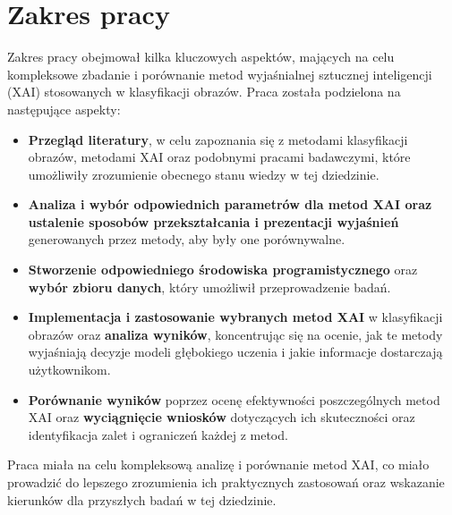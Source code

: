 \section*{Zakres pracy}
Zakres pracy obejmował kilka kluczowych aspektów, mających na celu kompleksowe zbadanie i porównanie metod wyjaśnialnej sztucznej inteligencji (XAI) stosowanych w klasyfikacji obrazów.
Praca została podzielona na następujące aspekty:
\begin{itemize}
	\item \textbf{Przegląd literatury}, w celu zapoznania się z metodami klasyfikacji obrazów, metodami XAI oraz podobnymi pracami badawczymi, które umożliwiły zrozumienie obecnego stanu wiedzy w tej dziedzinie.
	\item \textbf{Analiza i wybór odpowiednich parametrów dla metod XAI oraz ustalenie sposobów przekształcania i prezentacji wyjaśnień} generowanych przez metody, aby były one porównywalne.
	\item \textbf{Stworzenie odpowiedniego środowiska programistycznego} oraz \textbf{wybór zbioru danych}, który umożliwił przeprowadzenie badań.
	\item \textbf{Implementacja i zastosowanie wybranych metod XAI} w klasyfikacji obrazów oraz \textbf{analiza wyników}, koncentrując się na ocenie, jak te metody wyjaśniają decyzje modeli głębokiego uczenia i jakie informacje dostarczają użytkownikom.
	\item \textbf{Porównanie wyników} poprzez ocenę efektywności poszczególnych metod XAI oraz \textbf{wyciągnięcie wniosków} dotyczących ich skuteczności oraz identyfikacja zalet i ograniczeń każdej z metod.
\end{itemize}

Praca miała na celu kompleksową analizę i porównanie metod XAI, co miało prowadzić do lepszego zrozumienia ich praktycznych zastosowań oraz wskazanie kierunków dla przyszłych badań w tej dziedzinie.
